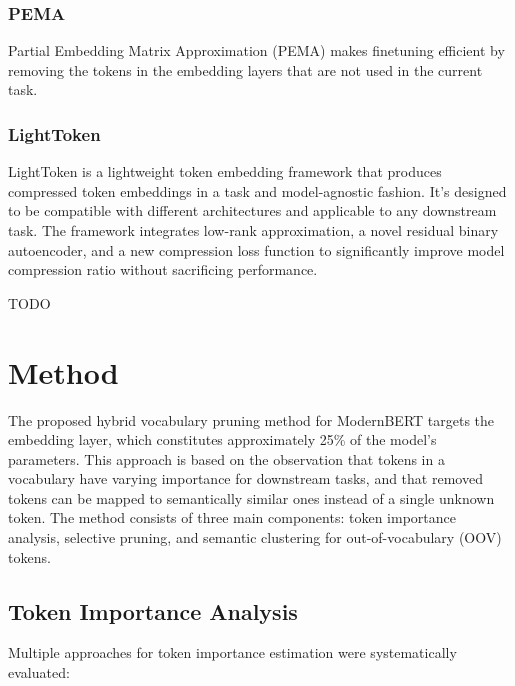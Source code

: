 \documentclass[twocolumn]{article}
\begin{document}
\subsubsection{PEMA}
Partial Embedding Matrix Approximation (PEMA) makes finetuning efficient by removing the tokens in the embedding layers that are not used in the current task.

\subsubsection{LightToken}
LightToken is a lightweight token embedding framework that produces compressed token embeddings in a task and model-agnostic fashion. It's designed to be compatible with different architectures and applicable to any downstream task. The framework integrates low-rank approximation, a novel residual binary autoencoder, and a new compression loss function to significantly improve model compression ratio without sacrificing performance.

\newpage
TODO


\newpage
\section{Method}

The proposed hybrid vocabulary pruning method for ModernBERT targets the embedding layer, which constitutes approximately 25\% of the model's parameters. This approach is based on the observation that tokens in a vocabulary have varying importance for downstream tasks, and that removed tokens can be mapped to semantically similar ones instead of a single unknown token. The method consists of three main components: token importance analysis, selective pruning, and semantic clustering for out-of-vocabulary (OOV) tokens.

\subsection{Token Importance Analysis}
Multiple approaches for token importance estimation were systematically evaluated:
\end{document}
